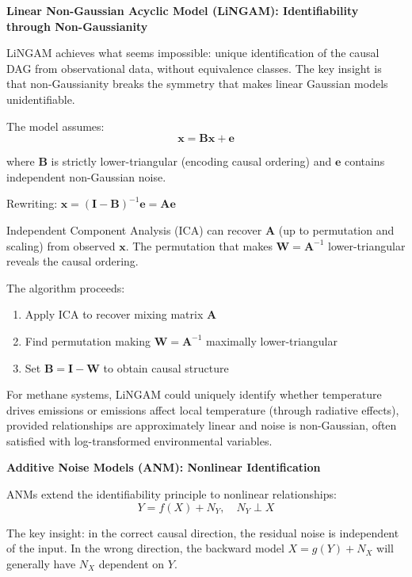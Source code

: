 \textbf{Linear Non-Gaussian Acyclic Model (LiNGAM): Identifiability through Non-Gaussianity}

LiNGAM achieves what seems impossible: unique identification of the causal DAG from observational data, without equivalence classes. The key insight is that non-Gaussianity breaks the symmetry that makes linear Gaussian models unidentifiable.

The model assumes:
\begin{equation}
\mathbf{x} = \mathbf{B}\mathbf{x} + \mathbf{e}
\end{equation}

where $\mathbf{B}$ is strictly lower-triangular (encoding causal ordering) and $\mathbf{e}$ contains independent non-Gaussian noise.

Rewriting: $\mathbf{x} = (\mathbf{I} - \mathbf{B})^{-1}\mathbf{e} = \mathbf{A}\mathbf{e}$

Independent Component Analysis (ICA) can recover $\mathbf{A}$ (up to permutation and scaling) from observed $\mathbf{x}$. The permutation that makes $\mathbf{W} = \mathbf{A}^{-1}$ lower-triangular reveals the causal ordering.

The algorithm proceeds:
\begin{enumerate}
\item Apply ICA to recover mixing matrix $\mathbf{A}$
\item Find permutation making $\mathbf{W} = \mathbf{A}^{-1}$ maximally lower-triangular
\item Set $\mathbf{B} = \mathbf{I} - \mathbf{W}$ to obtain causal structure
\end{enumerate}

For methane systems, LiNGAM could uniquely identify whether temperature drives emissions or emissions affect local temperature (through radiative effects), provided relationships are approximately linear and noise is non-Gaussian, often satisfied with log-transformed environmental variables.

\textbf{Additive Noise Models (ANM): Nonlinear Identification}

ANMs extend the identifiability principle to nonlinear relationships:
\begin{equation}
Y = f(X) + N_Y, \quad N_Y \perp X
\end{equation}

The key insight: in the correct causal direction, the residual noise is independent of the input. In the wrong direction, the backward model $X = g(Y) + N_X$ will generally have $N_X$ dependent on $Y$.

